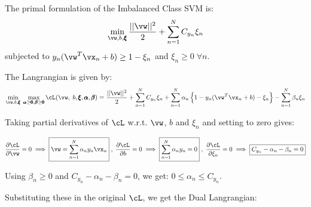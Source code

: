 \documentclass[a4paper,11pt]{article}
\begin{document}
\begin{mlsolution}

The primal formulation of the Imbalanced Class SVM is:
\begin{equation*}
    \min\limits_{\vw, b, \pmb{\xi}} \frac{||\vw||^2}{2}+\sum\limits_{n=1}^NC_{y_n}\xi_n
\end{equation*}
subjected to $y_n(\vw^T\vx_n+b)\geq1-\xi_n$ and $\xi_n\geq0 \; \forall n$.

The Langrangian is given by:
\begin{equation*}
    \min\limits_{\vw, b, \pmb{\xi}} \; \max\limits_{\pmb{\alpha}\geq\pmb{0}, \pmb{\beta}\geq\pmb{0}} \cL(\vw, \; b, \pmb{\xi}, \pmb{\alpha}, \pmb{\beta}) = \frac{||\vw||^2}{2}+\sum\limits_{n=1}^NC_{y_n}\xi_n + \sum\limits_{n=1}^N\alpha_n\bc{1-y_n(\vw^T\vx_n+b)-\xi_n} - \sum\limits_{n=1}^N\beta_n\xi_n
\end{equation*}

Taking partial derivatives of $\cL$ w.r.t. $\vw$, $b$ and $\xi_n$ and setting to zero gives:

\[
    \frac{\partial \cL}{\partial \vw}=0 \implies \boxed{\vw = \sum\limits_{n=1}^N\alpha_ny_n\vx_n}\; ,\; \frac{\partial \cL}{\partial b}=0 \implies \boxed{\sum\limits_{n=1}^N\alpha_ny_n = 0}\; ,\; \frac{\partial \cL}{\partial \xi_n}=0 \implies \boxed{C_{y_n}-\alpha_n-\beta_n=0}
\]

Using $\beta_n\geq0$ and $C_{y_n}-\alpha_n-\beta_n=0$, we get: $0\leq\alpha_n\leq C_{y_n}$.

Substituting these in the original $\cL$, we get the Dual Langrangian:


\end{mlsolution}
\end{document}
